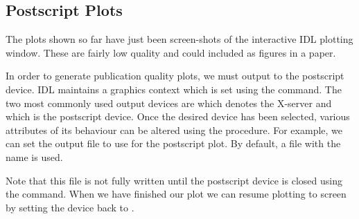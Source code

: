 \subsection{Postscript Plots}
  The plots shown so far have just been screen-shots of the interactive
  IDL plotting window. These are fairly low quality and could included as
  figures in a paper.

  In order to generate publication quality plots, we must output to the
  postscript device. IDL maintains a graphics context which is set using
  the  command. The two most commonly used output devices
  are  which denotes the X-server and  which is the postscript
  device. Once the desired device has been selected, various attributes
  of its behaviour can be altered using the  procedure.
  For example, we can set the output file to use for the postscript plot.
  By default, a file with the name  is used.

  Note that this file is not fully written until the postscript device is
  closed using the  command. When we have finished our
  plot we can resume plotting to screen by setting the device back to .



